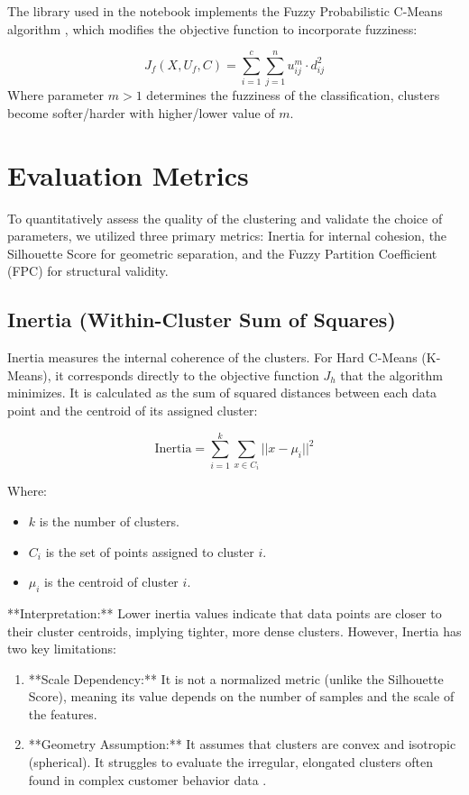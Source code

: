 \documentclass[12pt, a4paper]{article}
\begin{document}
The library used in the notebook implements the Fuzzy Probabilistic C-Means algorithm \cite{warner2024scikitfuzzy}, which modifies the objective function to incorporate fuzziness:

$$J_f(X,U_f,C) =\sum_{i=1}^c \sum_{j=1}^n u_{ij}^m \cdot d_{ij}^2$$
Where parameter $m > 1$ determines the fuzziness of the classification, clusters become softer/harder with higher/lower value of $m$. 

\section{Evaluation Metrics}
To quantitatively assess the quality of the clustering and validate the choice of parameters, we utilized three primary metrics: Inertia for internal cohesion, the Silhouette Score for geometric separation, and the Fuzzy Partition Coefficient (FPC) for structural validity.
\subsection{Inertia (Within-Cluster Sum of Squares)}
Inertia measures the internal coherence of the clusters. For Hard C-Means (K-Means), it corresponds directly to the objective function $J_h$ that the algorithm minimizes. It is calculated as the sum of squared distances between each data point and the centroid of its assigned cluster:

\begin{equation}
\text{Inertia} = \sum_{i=1}^k \sum_{x \in C_i} || x - \mu_i ||^2
\end{equation}

Where:
\begin{itemize}
    \item $k$ is the number of clusters.
    \item $C_i$ is the set of points assigned to cluster $i$.
    \item $\mu_i$ is the centroid of cluster $i$.
\end{itemize}

**Interpretation:**
Lower inertia values indicate that data points are closer to their cluster centroids, implying tighter, more dense clusters. However, Inertia has two key limitations:
\begin{enumerate}
    \item **Scale Dependency:** It is not a normalized metric (unlike the Silhouette Score), meaning its value depends on the number of samples and the scale of the features.
    \item **Geometry Assumption:** It assumes that clusters are convex and isotropic (spherical). It struggles to evaluate the irregular, elongated clusters often found in complex customer behavior data \cite{jain1988algorithms}.
\end{enumerate}
\end{document}
